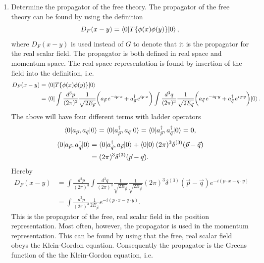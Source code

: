\begin{enumerate}
	\item Determine the propagator of the free theory. The propagator of the free theory can be found by using the definition
	\begin{equation}
		D_F(x-y)=\braket{0|T\{\phi(x)\phi(y)\}|0},
	\end{equation} 
	where $D_F(x-y)$ is used instead of $G$ to denote that it is the propagator for the real scalar field. The propagator is both defined in real space and momentum space. The real space representation is found by insertion of the field into the definition,  i.e.
	 \begin{equation}
		\begin{split}
			D_F(x-y)&=\braket{0|T\{\phi(x)\phi(y)\}|0}\\
			&=\braket{0|\int \frac{d^3 p}{(2\pi)^3}\frac{1}{\sqrt{2E_{\vec{p}}}}\bigg(a_{\vec{p}}\,e^{-ip\cdot x}+a_{\vec{p}}^\dagger\,e^{ip\cdot x}\bigg)\int \frac{d^3 q}{(2\pi)^3}\frac{1}{\sqrt{2E_{\vec{q}}}}\bigg(a_{\vec{q}}\,e^{-iq\cdot y}+a_{\vec{q}}^\dagger\,e^{iq\cdot y}\bigg)|0}.\\
		\end{split}
	\end{equation} 
	The above will have four different terms with ladder operators
	\begin{equation}
		\braket{0|a_{\vec{p}},a_{\vec{q}}|0}=\braket{0|a_{\vec{p}}^\dagger,a_{\vec{q}}|0}=\braket{0|a_{\vec{p}}^\dagger,a_{\vec{q}}^\dagger|0}=0,
	\end{equation} 
	\begin{equation}
		\begin{split}
			\braket{0|a_{\vec{p}},a_{\vec{q}}^\dagger|0}&=\braket{0|a_{\vec{q}}^\dagger,a_{\vec{p}}|0}+\braket{0|0}(2\pi)^3\delta^{(3)}(\vec{p}-\vec{q})\\
			&=(2\pi)^3\delta^{(3)}(\vec{p}-\vec{q}).
		\end{split}
	\end{equation} 
	Hereby
	\begin{equation}
		\begin{split}
			D_F(x-y)&=\int \frac{d^3 p}{(2\pi)^3}\int \frac{d^3 q}{(2\pi)^3}\frac{1}{\sqrt{2E_{\vec{p}}}}\frac{1}{\sqrt{2E_{\vec{q}}}}(2\pi)^3\delta^{(3)}(\vec{p}-\vec{q})e^{-i(p\cdot x-q\cdot y)}\\
			&=\int \frac{d^3 p}{(2\pi)^3}\frac{1}{2E_{\vec{p}}}e^{-i(p\cdot x-q\cdot y)}.
			\label{prop1}
		\end{split}
	\end{equation} 
	This is the propagator of the free, real scalar field in the position representation. Most often, however, the propagator is used in the momentum representation. This can be found by using that the free, real scalar field obeys the Klein-Gordon equation. Consequently the propagator is the Greens function of the the Klein-Gordon equation,  i.e.

\end{enumerate}
